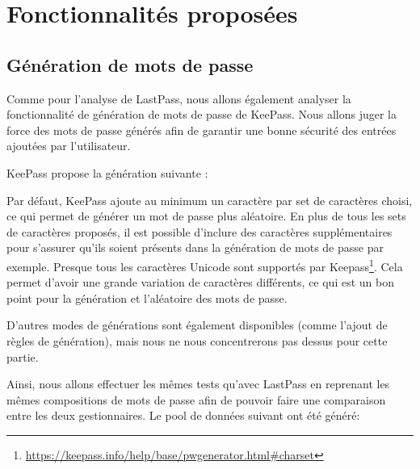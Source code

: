 \section{Fonctionnalités proposées}
\subsection{Génération de mots de passe}

Comme pour l'analyse de LastPass, nous allons également analyser la fonctionnalité de génération de mots de passe de KeePass\cite{pw}. Nous allons juger la force des mots de passe générés afin de garantir une bonne sécurité des entrées ajoutées par l'utilisateur. 

KeePass propose la génération suivante :

\begin{table}[H]
	\centering
	\caption{Fonctionnalités de KeePass pour la génération de mots de passe}
\end{table}

Par défaut, KeePass ajoute au minimum un caractère par set de caractères choisi, ce qui permet de générer un mot de passe plus aléatoire. En plus de tous les sets de caractères proposés, il est possible d'inclure des caractères supplémentaires pour s'assurer qu'ils soient présents dans la génération de mots de passe par exemple. Presque tous les caractères Unicode sont supportés par Keepass\footnote{\href{https://keepass.info/help/base/pwgenerator.html\#charset}{https://keepass.info/help/base/pwgenerator.html\#charset}}. Cela permet d'avoir une grande variation de caractères différents, ce qui est un bon point pour la génération et l'aléatoire des mots de passe. 

D'autres modes de générations sont également disponibles (comme l'ajout de règles de génération), mais nous ne nous concentrerons pas dessus pour cette partie. 

Ainsi, nous allons effectuer les mêmes tests qu'avec LastPass en reprenant les mêmes compositions de mots de passe afin de pouvoir faire une comparaison entre les deux gestionnaires. Le pool de données suivant ont été généré:

